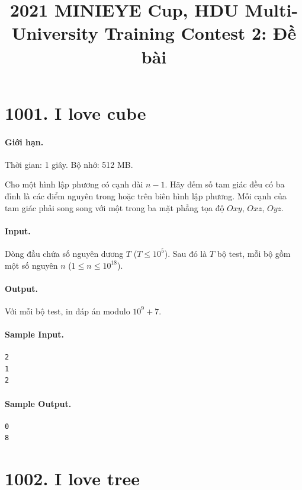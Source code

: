 \documentclass[11pt]{article}
\title{2021 MINIEYE Cup, HDU Multi-University Training Contest 2: Đề bài}
\author{}
\date{}
\begin{document}
\maketitle


\section{1001. I love cube}

\paragraph{Giới hạn.} Thời gian: 1 giây. Bộ nhớ: 512 MB.

Cho một hình lập phương có cạnh dài $n-1$.  Hãy đếm số tam giác đều có ba đỉnh
là các điểm nguyên trong hoặc trên biên hình lập phương.  Mỗi cạnh của tam giác
phải song song với một trong ba mặt phẳng tọa độ $Oxy$, $Oxz$, $Oyz$.

\paragraph{Input.}
Dòng đầu chứa số nguyên dương $T$ ($T\le 10^5$).  Sau đó là $T$ bộ test, mỗi
bộ gồm một số nguyên $n$ ($1\le n\le 10^{18}$).

\paragraph{Output.}
Với mỗi bộ test, in đáp án modulo $10^9+7$.

\paragraph{Sample Input.}
\begin{verbatim}
2
1
2
\end{verbatim}

\paragraph{Sample Output.}
\begin{verbatim}
0
8
\end{verbatim}

\section{1002. I love tree}
\end{document}
